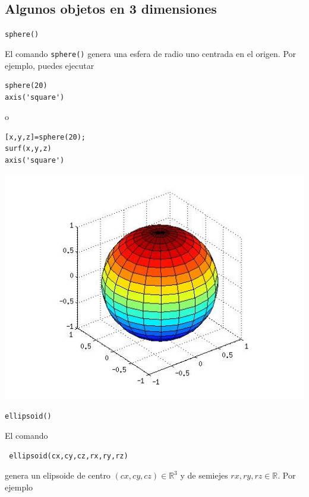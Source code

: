 \documentclass[11pt]{article}
\begin{document}
\subsection{Algunos objetos en 3 dimensiones}

\texttt{sphere()}

El comando \texttt{sphere()} genera una esfera de radio uno 
centrada en el origen. Por ejemplo, puedes ejecutar 

\begin{minipage}{0.4\textwidth}
\begin{verbatim}
sphere(20)
axis('square')
\end{verbatim}
o
\begin{verbatim}
[x,y,z]=sphere(20);
surf(x,y,z)
axis('square')
\end{verbatim} 
\end{minipage}
\begin{minipage}{0.5\textwidth}
 \begin{center}
      \includegraphics[width=\textwidth]{./esfera.jpg}
 \end{center}
\end{minipage}

\texttt{ellipsoid()}

El comando
\begin{verbatim}
 ellipsoid(cx,cy,cz,rx,ry,rz)
\end{verbatim}
genera un elipsoide de centro $(cx,cy,cz)\in\mathbb{R}^3$ y de semiejes $rx,ry,rz\in\mathbb{R}$. Por ejemplo
\end{document}
